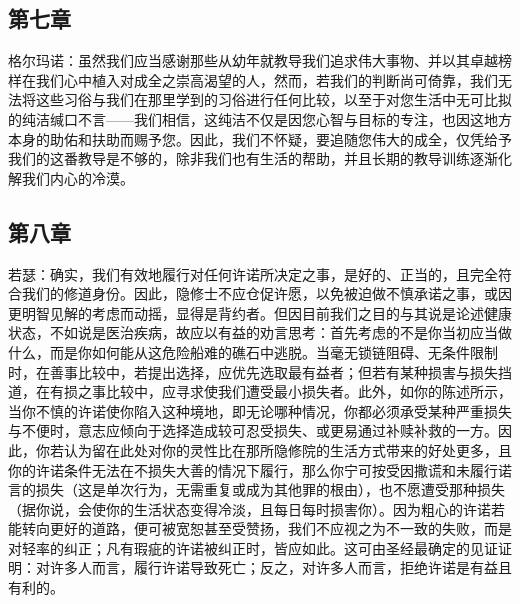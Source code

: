 
\subsection{第七章}

\par

格尔玛诺：虽然我们应当感谢那些从幼年就教导我们追求伟大事物、并以其卓越榜样在我们心中植入对成全之崇高渴望的人，然而，若我们的判断尚可倚靠，我们无法将这些习俗与我们在那里学到的习俗进行任何比较，以至于对您生活中无可比拟的纯洁缄口不言——我们相信，这纯洁不仅是因您心智与目标的专注，也因这地方本身的助佑和扶助而赐予您。因此，我们不怀疑，要追随您伟大的成全，仅凭给予我们的这番教导是不够的，除非我们也有生活的帮助，并且长期的教导训练逐渐化解我们内心的冷漠。\par


\subsection{第八章}

\par

若瑟：确实，我们有效地履行对任何许诺所决定之事，是好的、正当的，且完全符合我们的修道身份。因此，隐修士不应仓促许愿，以免被迫做不慎承诺之事，或因更明智见解的考虑而动摇，显得是背约者。但因目前我们之目的与其说是论述健康状态，不如说是医治疾病，故应以有益的劝言思考：首先考虑的不是你当初应当做什么，而是你如何能从这危险船难的礁石中逃脱。当毫无锁链阻碍、无条件限制时，在善事比较中，若提出选择，应优先选取最有益者；但若有某种损害与损失挡道，在有损之事比较中，应寻求使我们遭受最小损失者。此外，如你的陈述所示，当你不慎的许诺使你陷入这种境地，即无论哪种情况，你都必须承受某种严重损失与不便时，意志应倾向于选择造成较可忍受损失、或更易通过补赎补救的一方。因此，你若认为留在此处对你的灵性比在那所隐修院的生活方式带来的好处更多，且你的许诺条件无法在不损失大善的情况下履行，那么你宁可按受因撒谎和未履行诺言的损失（这是单次行为，无需重复或成为其他罪的根由），也不愿遭受那种损失（据你说，会使你的生活状态变得冷淡，且每日每时损害你）。因为粗心的许诺若能转向更好的道路，便可被宽恕甚至受赞扬，我们不应视之为不一致的失败，而是对轻率的纠正；凡有瑕疵的许诺被纠正时，皆应如此。这可由圣经最确定的见证证明：对许多人而言，履行许诺导致死亡；反之，对许多人而言，拒绝许诺是有益且有利的。\par

